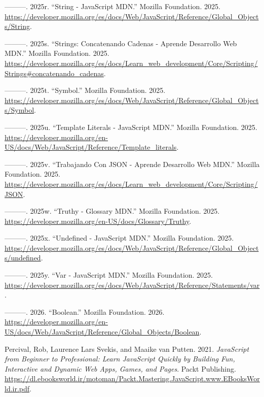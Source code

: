 \documentclass[
  letterpaper,
  DIV=11,
  numbers=noendperiod]{scrreprt}
\newlength{\cslhangindent}
\newenvironment{CSLReferences}[2] %
 {\begin{list}{}{%
  \setlength{\itemindent}{0pt}
  \setlength{\leftmargin}{0pt}
  \setlength{\parsep}{0pt}
  \ifodd #1
   \setlength{\leftmargin}{\cslhangindent}
   \setlength{\itemindent}{-1\cslhangindent}
  \fi
  \setlength{\itemsep}{#2\baselineskip}}}
 {\end{list}}
\begin{document}
\begin{CSLReferences}{1}{0}
---------. 2025r. {``String - JavaScript \textbar{} MDN.''} Mozilla
Foundation. 2025.
\url{https://developer.mozilla.org/es/docs/Web/JavaScript/Reference/Global_Objects/String}.

---------. 2025s. {``Strings: Concatenando Cadenas - Aprende Desarrollo
Web \textbar{} MDN.''} Mozilla Foundation. 2025.
\url{https://developer.mozilla.org/es/docs/Learn_web_development/Core/Scripting/Strings\#concatenando_cadenas}.

---------. 2025t. {``Symbol.''} Mozilla Foundation. 2025.
\url{https://developer.mozilla.org/es/docs/Web/JavaScript/Reference/Global_Objects/Symbol}.

---------. 2025u. {``Template Literals - JavaScript \textbar{} MDN.''}
Mozilla Foundation. 2025.
\url{https://developer.mozilla.org/en-US/docs/Web/JavaScript/Reference/Template_literals}.

---------. 2025v. {``Trabajando Con JSON - Aprende Desarrollo Web
\textbar{} MDN.''} Mozilla Foundation. 2025.
\url{https://developer.mozilla.org/es/docs/Learn_web_development/Core/Scripting/JSON}.

---------. 2025w. {``Truthy - Glossary \textbar{} MDN.''} Mozilla
Foundation. 2025.
\url{https://developer.mozilla.org/en-US/docs/Glossary/Truthy}.

---------. 2025x. {``Undefined - JavaScript \textbar{} MDN.''} Mozilla
Foundation. 2025.
\url{https://developer.mozilla.org/es/docs/Web/JavaScript/Reference/Global_Objects/undefined}.

---------. 2025y. {``Var - JavaScript \textbar{} MDN.''} Mozilla
Foundation. 2025.
\url{https://developer.mozilla.org/es/docs/Web/JavaScript/Reference/Statements/var}.

---------. 2026. {``Boolean.''} Mozilla Foundation. 2026.
\url{https://developer.mozilla.org/en-US/docs/Web/JavaScript/Reference/Global_Objects/Boolean}.

Percival, Rob, Laurence Lars Svekis, and Maaike van Putten. 2021.
\emph{JavaScript from Beginner to Professional: Learn JavaScript Quickly
by Building Fun, Interactive and Dynamic Web Apps, Games, and Pages}.
Packt Publishing.
\url{https://dl.ebooksworld.ir/motoman/Packt.Mastering.JavaScript.www.EBooksWorld.ir.pdf}.


\end{CSLReferences}
\end{document}
